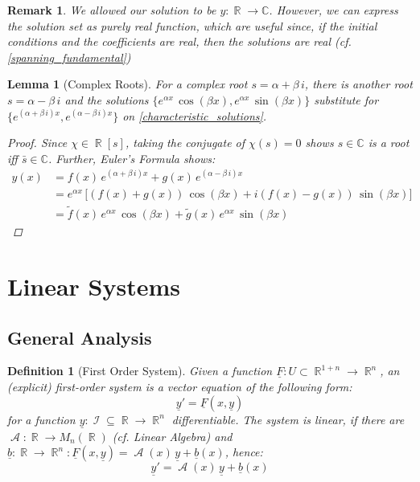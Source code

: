 \documentclass[12pt]{article}
\DeclareMathOperator{\R}{\mathbb{R}}
\DeclareMathOperator{\I}{\mathcal{I}}
\DeclareMathOperator{\A}{\mathcal{A}}
\newcommand{\tuple}[1]{\underline{#1}}
\newtheorem{definition}[theorem]{Definition}
\newtheorem{lemma}[theorem]{Lemma}
\newtheorem{remark}[theorem]{Remark}
\begin{document}
\begin{remark}
  We allowed our solution to be $y:\R\to\mathbb{C}$. However, we can express the solution set as purely real function, which are useful since, if the initial conditions and the coefficients are real, then the solutions are real (cf. \ref{spanning_fundamental})
\end{remark}

\begin{lemma}[Complex Roots]
  For a complex root $s=\alpha+\beta\,i$, there is another root $s=\alpha-\beta\,i$ and the solutions $\{e^{\alpha x}\,\cos(\beta x),e^{\alpha x}\,\sin(\beta x)\}$ substitute for $\{e^{(\alpha+\beta\,i)x},e^{(\alpha-\beta\,i)x}\}$ on \ref{characteristic_solutions}.
  \begin{proof}
    Since $\chi\in\R[s]$, taking the conjugate of $\chi(s)=0$ shows $s\in\mathbb{C}$ is a root iff $\bar{s}\in\mathbb{C}$. Further, Euler's Formula shows: 
    \begin{align*}
      y(x)&=f(x)\,e^{(\alpha+\beta\,i)x}+g(x)\,e^{(\alpha-\beta\,i)x}\\
      &=e^{\alpha x}\,\Big[(f(x)+g(x))\,\cos(\beta x)+i(f(x)-g(x))\,\sin(\beta x)\Big]\\
      &=\tilde{f}(x)\,e^{\alpha x}\,\cos(\beta x)+\tilde{g}(x)\,e^{\alpha x}\,\sin(\beta x)
    \end{align*}
  \end{proof}
\end{lemma}

\pagebreak

\section{Linear Systems}

\subsection{General Analysis}

\begin{definition}[First Order System]
  Given a function $\tuple{F}:U\subset\R^{1+n}\to\R^n$, an (explicit) first-order system is a vector equation of the following form: $$\tuple{y}'=\tuple{F}(x,\tuple{y})$$ for a function $\tuple{y}:\I\subseteq\R\to\R^n$ differentiable. The system is linear, if there are $\A:\R\to M_n(\R)$ (cf. Linear Algebra) and $\tuple{b}:\R\to\R^n:\tuple{F}(x,\tuple{y})=\A(x)\,\tuple{y}+\tuple{b}(x)$, hence: $$\tuple{y}'=\A(x)\,\tuple{y}+\tuple{b}(x)$$
\end{definition}
\end{document}
